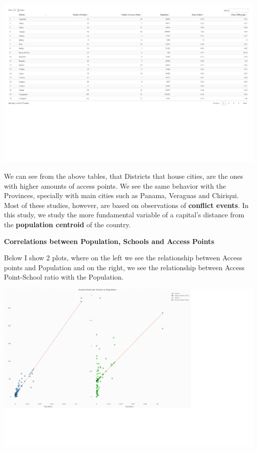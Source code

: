 \documentclass[
  letterpaper,
  DIV=11,
  numbers=noendperiod]{scrartcl}
\begin{document}
\includegraphics{index_files/figure-pdf/exploratoy-data-analysis-2.pdf}

We can see from the above tables, that Districts that house cities, are
the ones with higher amounts of access points. We see the same behavior
with the Provinces, specially with main cities such as Panama, Veraguas
and Chiriqui. Most of these studies, however, are based on observations
of \textbf{conflict events}. In this study, we study the more
fundamental variable of a capital's distance from the \textbf{population
centroid} of the country.

\textbf{Correlations between Population, Schools and Access Points}

Below I show 2 plots, where on the left we see the relationship between
Access points and Population and on the right, we see the relationship
between Access Point-School ratio with the Population.

\includegraphics{index_files/figure-pdf/summary-plots-1.pdf}
\end{document}
